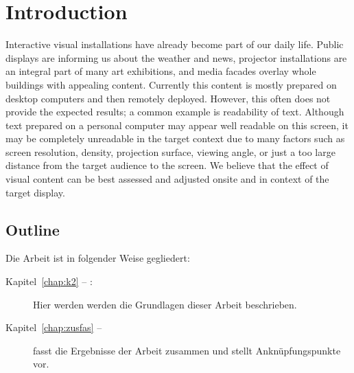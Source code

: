 \chapter{Introduction}
Interactive visual installations have already become part of our daily life. Public displays are informing us about the weather and news, projector installations are an integral part of many art exhibitions, and media facades overlay whole buildings with appealing content. Currently this content is mostly prepared on desktop computers and then remotely deployed. However, this often does not provide the expected results; a common example is readability of text. Although text prepared on a personal computer may appear well readable on this screen, it may be completely unreadable in the target context due to many factors such as screen resolution, density, projection surface, viewing angle, or just a too large distance from the target audience to the screen. We believe that the effect of visual content can be best assessed and adjusted onsite and in context of the target display.

\section*{Outline}
Die Arbeit ist in folgender Weise gegliedert:
\begin{description}
\item[Kapitel~\ref{chap:k2} -- :] Hier werden werden die Grundlagen dieser Arbeit beschrieben.
\item[Kapitel~\ref{chap:zusfas} -- ] fasst die Ergebnisse der Arbeit zusammen und stellt Anknüpfungspunkte vor.
\end{description}
